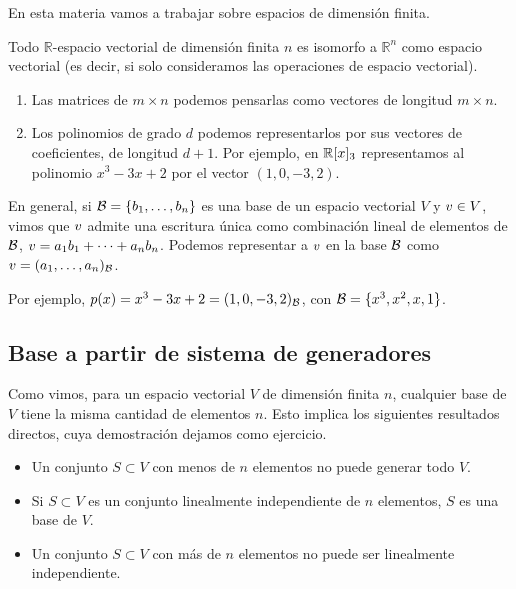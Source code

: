 En esta materia vamos a trabajar sobre espacios de dimensión finita.

\begin{proposicion}
 Todo $\mathbb{R}$-espacio vectorial de dimensión finita $n$ es isomorfo a $\mathbb{R}^n$ como espacio vectorial (es decir, si solo consideramos las operaciones de espacio vectorial).
 \end{proposicion}

\begin{ejemplo} \leavevmode
\begin{enumerate}
\item Las matrices de $m \times n$ podemos pensarlas como vectores de longitud $m \times n$.
\item Los polinomios de grado $d$ podemos representarlos por sus vectores de coeficientes, de longitud $d + 1$. Por ejemplo, en $\mathbb R[x]_3$ representamos al polinomio $x^3 -3x + 2$ por el vector $(1, 0, -3, 2)$.
\end{enumerate}
\end{ejemplo}

En general, si $\B = \{\bb_1, \dots, \bb_n\}$ es una base de un espacio vectorial $V$ y $\vb \in V$, vimos que $\vb$ admite una escritura única como combinación lineal de elementos de $\mathcal B$, $\vb = a_1 \bb_1 + \dots + a_n \bb_n$. Podemos representar a $\vb$ en la base $\mathcal B$ como $\vb = (a_1, \dots, a_n)_{\B}$.

Por ejemplo, $p(x) = x^3-3x+2 = (1, 0, -3, 2)_{\mathcal B}$, con $\mathcal B= \{x^3, x^2, x, 1\}$.

\subsection{Base a partir de sistema de generadores}

Como vimos, para un espacio vectorial $V$ de dimensión finita $n$, cualquier base de $V$ tiene la misma cantidad de elementos $n$.
Esto implica los siguientes resultados directos, cuya demostración dejamos como ejercicio.
\begin{itemize}
\item Un conjunto $S \subset V$ con menos de $n$ elementos no puede generar todo $V$.
\item Si $S \subset V$ es un conjunto linealmente independiente de $n$ elementos, $S$ es una base de $V$.
\item Un conjunto $S \subset V$ con más de $n$ elementos no puede ser linealmente independiente.
\end{itemize}

